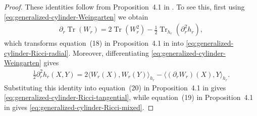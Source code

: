 \documentclass[11pt,reqno]{amsart}
\numberwithin{equation}{section}
\theoremstyle{definition}
\theoremstyle{remark}
\newcommand{\la}{\langle}
\newcommand{\ra}{\rangle}
\newcommand{\Tr}{\operatorname{Tr}}
\newcommand{\0}{\emptyset}
\begin{document}
\begin{proof}
These identities follow from Proposition~4.1 in \cite{barGauduchonMoroianu2005}. To see this, first using
\eqref{eq:generalized-cylinder-Weingarten} we obtain
\begin{align}
        \partial_r\Tr(W_r)
        =
        2\Tr(W_r^2)
        -
        \frac12\Tr_{h_r}(\partial_r^2h_r),
\end{align}
which transforms equation~(18) in Proposition~4.1 in \cite{barGauduchonMoroianu2005} into
\eqref{eq:generalized-cylinder-Ricci-radial}. Moreover, differentiating \eqref{eq:generalized-cylinder-Weingarten} gives
\begin{align}
        \frac12\partial_r^2h_r(X,Y)
        =
        2\la W_r(X),W_r(Y)\ra_{h_r}
        -
        \la(\partial_rW_r)(X),Y\ra_{h_r}.
\end{align}
Substituting this identity into equation~(20) in Proposition~4.1 in \cite{barGauduchonMoroianu2005} gives \eqref{eq:generalized-cylinder-Ricci-tangential}, while equation~(19) in Proposition~4.1 in \cite{barGauduchonMoroianu2005} gives \eqref{eq:generalized-cylinder-Ricci-mixed}.
\end{proof}
\end{document}
